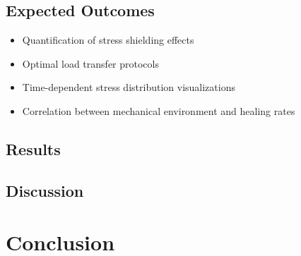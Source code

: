 \documentclass{article}
\begin{document}
\subsection{Expected Outcomes}
\begin{itemize}
  \item Quantification of stress shielding effects
  \item Optimal load transfer protocols
  \item Time-dependent stress distribution visualizations
  \item Correlation between mechanical environment and healing rates
\end{itemize}

\subsection{Results}

\subsection{Discussion}

\section{Conclusion}






\end{document}
